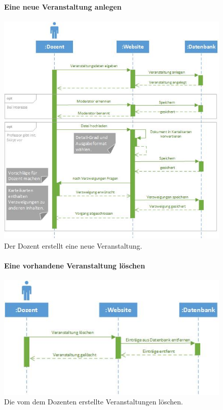 \documentclass[12pt,a4paper]{article}
\begin{document}
\begin{figure}[H]
	\centering
	\paragraph{Eine neue Veranstaltung anlegen}
	\includegraphics[width=\textwidth]{Bilder/Sequenzdiagramme/VeranstaltungAnlegen1.jpg}
	\caption{Der Dozent erstellt eine neue Veranstaltung.}
	\label{SzVeranstaltungAnlegen}
\end{figure}
\begin{figure}[H]
	\centering
	\paragraph{Eine vorhandene Veranstaltung löschen}
	\includegraphics[width=\textwidth]{Bilder/Sequenzdiagramme/VeranstaltungLoeschen1.jpg}
	\caption{Die vom dem Dozenten erstellte Veranstaltungen löschen.}
	\label{SzVeranstaltungLoeschen}
\end{figure}
\end{document}
